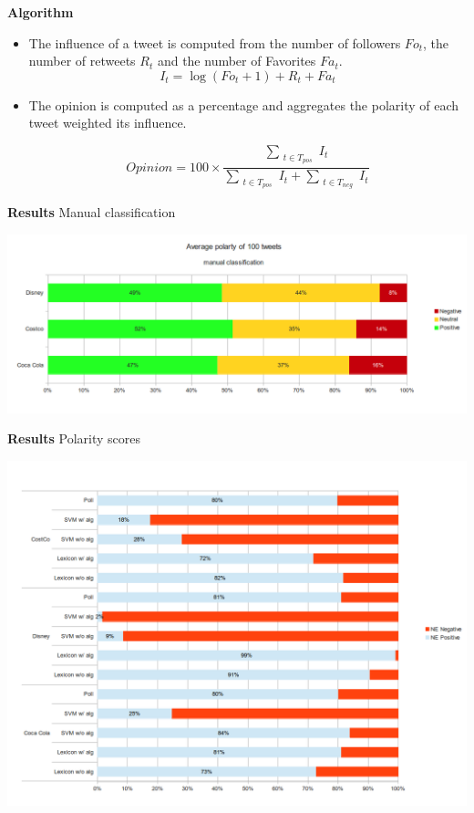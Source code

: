 \documentclass[landscape,20pt]{extarticle}
\newcommand*{\TitleFont}{\Huge \bf}
\begin{document}
\clearpage
\thispagestyle{empty}

{\TitleFont Algorithm}
\begin{itemize}
\item The influence of a tweet is computed from the number of followers $Fo_t$, the number of retweets $R_t$ and the number of Favorites $Fa_t$.
\begin{equation}
I_t = \log (Fo_t + 1) + R_t + Fa_t
\end{equation}

\item The opinion is computed as a percentage and aggregates the polarity of each tweet weighted its influence.

\begin{equation}
Opinion = 100 \times \frac{\sum_{\substack{t \in T_{pos}}} I_t}{\sum_{\substack{t \in T_{pos}}} I_t + \sum_{\substack{t \in T_{neg}}} I_t}
\end{equation}

\end{itemize}

\clearpage
\thispagestyle{empty}

{\TitleFont Results}
\newline
\small{Manual classification}
\newline
\newline
\newline
\newline
\centerline{\includegraphics[scale=0.85]{../img/man1.png}}

\clearpage
\thispagestyle{empty}

{\TitleFont Results}
\newline
\small{Polarity scores}
\newline
\centerline{\includegraphics[scale=0.7]{../img/full1.png}}
\end{document}
